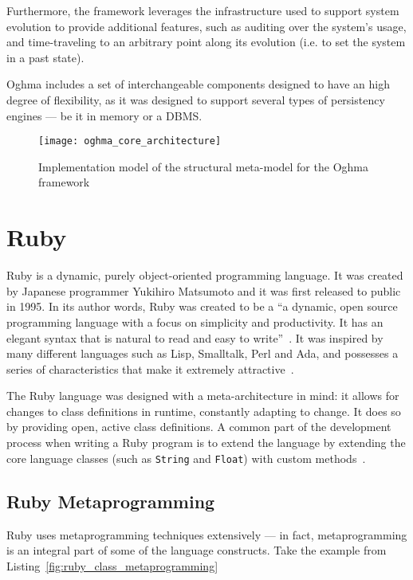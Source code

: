 Furthermore, the framework leverages the infrastructure used to support system evolution to provide additional features, such as auditing over the system’s usage, and time-traveling to an arbitrary point along its evolution (i.e. to set the system in a past state).

Oghma includes a set of interchangeable components designed to have an high degree of flexibility, as it was designed to support several types of persistency engines --- be it in memory or a DBMS.

\begin{figure}[H]
  \centering
  \texttt{[image: oghma\_core\_architecture]}
  \caption{Implementation model of the structural meta-model for the Oghma framework}
  \label{fig:oghma_core_architecture}
\end{figure}

\section{Ruby}\label{sec:ruby}

Ruby is a dynamic, purely object-oriented programming language. It was created by Japanese programmer Yukihiro Matsumoto and it was first released to public in 1995. In its author words, Ruby was created to be a ``a dynamic, open source programming language with a focus on simplicity and productivity. It has an elegant syntax that is natural to read and easy to write''~\cite{ruby}. It was inspired by many different languages such as Lisp, Smalltalk, Perl and Ada, and possesses a series of characteristics that make it extremely attractive~\cite{ruby}.

The Ruby language was designed with a meta-architecture in mind: it allows for changes to class definitions in runtime, constantly adapting to change. It does so by providing open, active class definitions. A common part of the development process when writing a Ruby program is to extend the language by extending the core language classes (such as \verb!String! and \verb!Float!) with custom methods~\cite{metaprogramming_ruby}.

\subsection{Ruby Metaprogramming}\label{sec:ruby_metaprogramming}

Ruby uses metaprogramming techniques extensively --- in fact, metaprogramming is an integral part of some of the language constructs. Take the example from Listing~\ref{fig:ruby_class_metaprogramming}

